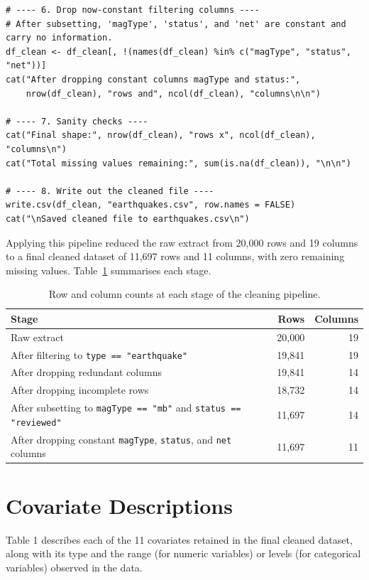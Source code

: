 \documentclass[11pt]{article}
\begin{document}
\begin{lstlisting}[style=Rstyle, caption={R script used to clean the raw USGS earthquake catalog extract.}, label={lst:clean}]
# ---- 6. Drop now-constant filtering columns ----
# After subsetting, 'magType', 'status', and 'net' are constant and carry no information.
df_clean <- df_clean[, !(names(df_clean) %in% c("magType", "status", "net"))]
cat("After dropping constant columns magType and status:",
    nrow(df_clean), "rows and", ncol(df_clean), "columns\n\n")

# ---- 7. Sanity checks ----
cat("Final shape:", nrow(df_clean), "rows x", ncol(df_clean), "columns\n")
cat("Total missing values remaining:", sum(is.na(df_clean)), "\n\n")

# ---- 8. Write out the cleaned file ----
write.csv(df_clean, "earthquakes.csv", row.names = FALSE)
cat("\nSaved cleaned file to earthquakes.csv\n")
\end{lstlisting}

Applying this pipeline reduced the raw extract from 20{,}000 rows and 19 columns
to a final cleaned dataset of 11{,}697 rows and 11 columns, with zero remaining
missing values. Table~\ref{tab:pipeline} summarises each stage.

\begin{table}[h]
\centering
\begin{tabular}{lrr}
\toprule
Stage & Rows & Columns \\
\midrule
Raw extract & 20{,}000 & 19 \\
After filtering to \texttt{type == "earthquake"} & 19{,}841 & 19 \\
After dropping redundant columns & 19{,}841 & 14 \\
After dropping incomplete rows & 18{,}732 & 14 \\
After subsetting to \texttt{magType == "mb"} and \texttt{status == "reviewed"} & 11{,}697 & 14 \\
After dropping constant \texttt{magType}, \texttt{status}, and \texttt{net} columns & 11{,}697 & 11 \\
\bottomrule
\end{tabular}
\caption{Row and column counts at each stage of the cleaning pipeline.}
\label{tab:pipeline}
\end{table}

\section{Covariate Descriptions}

Table 1 describes each of the 11 covariates retained in the
final cleaned dataset, along with its type and the range (for numeric variables)
or levels (for categorical variables) observed in the data.
\end{document}

